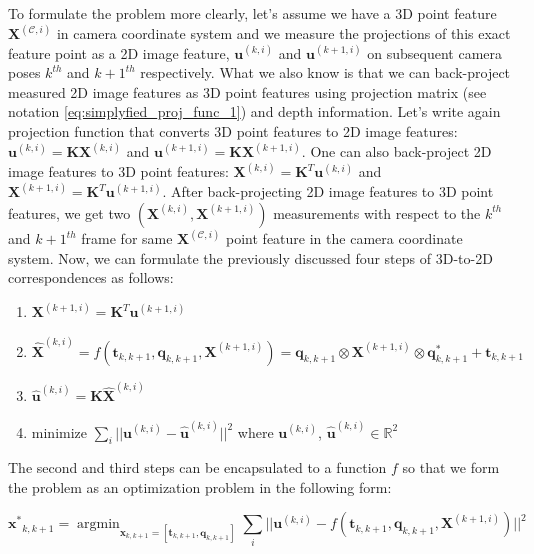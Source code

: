 \documentclass[a4paper]{report}
\numberwithin{figure}{section}
\newcommand{\argmin}{\mathop{\mathrm{argmin}}}
\newcommand{\R}{\mathbb{R}}
\begin{document}
To formulate the problem more clearly, let's assume we have a 3D point feature 
$\mathbf{X}^{(\mathcal{C}, i)}$ in camera coordinate system and 
we measure 
the projections of this exact feature point as a 2D image feature, 
$\mathbf{u}^{(k,i)}$ and $\mathbf{u}^{(k+1,i)}$ on subsequent 
camera poses $k^{th}$ and $k+1^{th}$ respectively. What we also know is that 
we can back-project measured 2D image features as 3D point features using 
projection matrix (see notation \eqref{eq:simplyfied_proj_func_1}) and depth 
information. Let's write again projection function that converts 3D point 
features to 2D image features: $\mathbf{u}^{(k,i)} = 
\mathbf{K}\mathbf{X}^{(k,i)}$ and $\mathbf{u}^{(k+1,i)} = 
\mathbf{K}\mathbf{X}^{(k+1,i)}$.
One can also back-project 2D image features to 3D point features: 
$\mathbf{X}^{(k,i)} = \mathbf{K}^T\mathbf{u}^{(k,i)}$ and 
$\mathbf{X}^{(k+1,i)} = \mathbf{K}^T\mathbf{u}^{(k+1,i)}$. 
After back-projecting 2D image features to 3D point features, 
we get two 
$(\mathbf{X}^{(k,i)},\mathbf{X}^{(k+1,i)})$ measurements with respect to the 
$k^{th}$
and $k+1^{th}$ frame for  
same $\mathbf{X}^{(\mathcal{C}, i)}$ point feature in the camera coordinate 
system. 
Now, we can formulate the 
previously discussed four steps of 3D-to-2D correspondences as follows:

\begin{enumerate}
  \item $\mathbf{X}^{(k+1,i)} = \mathbf{K}^T\mathbf{u}^{(k+1,i)}$
  \item $\mathbf{\hat{X}}^{(k,i)} = f(\mathbf{t}_{k,k+1}, \mathbf{q}_{k,k+1}, 
  \mathbf{X}^{(k+1,i)}) = 
    \mathbf{q}_{k,k+1} \otimes \mathbf{X}^{(k+1,i)} \otimes 
    \mathbf{q}_{k,k+1}^* + \mathbf{t}_{k,k+1} $
  \item $\mathbf{\hat{u}}^{(k,i)} = \mathbf{K}\mathbf{\hat{X}}^{(k,i)}$
  \item minimize $\sum_i||\mathbf{u}^{(k,i)} - \mathbf{\hat{u}}^{(k,i)}||^2$ 
  where 
    $\mathbf{u}^{(k,i)}$, $\mathbf{\hat{u}}^{(k,i)} \in \R^2$
\end{enumerate}

The second and third steps can be encapsulated to a function $f$ so that 
we form the problem as an optimization problem in the following form:

\begin{equation}
  \mathbf{x^*}_{k,k+1} = \argmin_{\mathbf{x}_{k,k+1} = [\mathbf{t}_{k,k+1}, 
  \mathbf{q}_{k,k+1}]}
  \sum_i||\mathbf{u}^{(k,i)} - f(\mathbf{t}_{k,k+1}, \mathbf{q}_{k,k+1}, 
  \mathbf{X}^{(k+1,i)})||^2
\end{equation}
\end{document}

